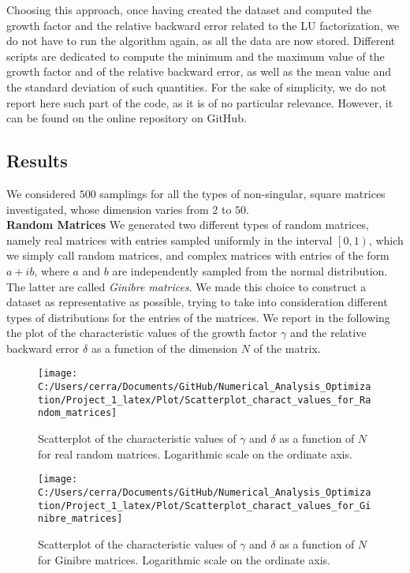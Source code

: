 \documentclass[a4paper,11pt]{report}
\begin{document}
\noindent Choosing this approach, once having created the dataset and computed the growth factor and the relative backward error related to the LU factorization, we do not have to run the algorithm again, as all the data are now stored. Different scripts are dedicated to compute the minimum and the maximum value of the growth factor and of the relative backward error, as well as the mean value and the standard deviation of such quantities. For the sake of simplicity, we do not report here such part of the code, as it is of no particular relevance. However, it can be found on the online repository on GitHub.

\subsection*{Results}
We considered $500$ samplings for all the types of non-singular, square matrices investigated, whose dimension varies from $2$ to $50$.\\

\noindent \textbf{Random Matrices } We generated two different types of random matrices, namely real matrices with entries sampled uniformly in the interval $\left[0,1\right)$, which we simply call random matrices, and complex matrices with entries of the form $a+ib$, where $a$ and $b$ are independently sampled from the normal distribution. The latter are called \textit{Ginibre matrices}. We made this choice to construct a dataset as representative as possible, trying to take into consideration different types of distributions for the entries of the matrices. We report in the following the plot of the characteristic values of the growth factor $\gamma$ and the relative backward error $\delta$ as a function of the dimension $N$ of the matrix.

\begin{figure}[H]
	\centering
	\texttt{[image: C:/Users/cerra/Documents/GitHub/Numerical\_Analysis\_Optimization/Project\_1\_latex/Plot/Scatterplot\_charact\_values\_for\_Random\_matrices]}
	\caption{Scatterplot of the characteristic values of $\gamma$ and $\delta$ as a function of $N$ for real random matrices. Logarithmic scale on the ordinate axis.}
	\label{fig:Scatterplot_Random}
\end{figure}

\begin{figure}[H]
	\centering
	\texttt{[image: C:/Users/cerra/Documents/GitHub/Numerical\_Analysis\_Optimization/Project\_1\_latex/Plot/Scatterplot\_charact\_values\_for\_Ginibre\_matrices]}
	\caption{Scatterplot of the characteristic values of $\gamma$ and $\delta$ as a function of $N$ for Ginibre matrices. Logarithmic scale on the ordinate axis.}
	\label{fig:Scatterplot_Ginibre}
\end{figure}
	
\end{document}

